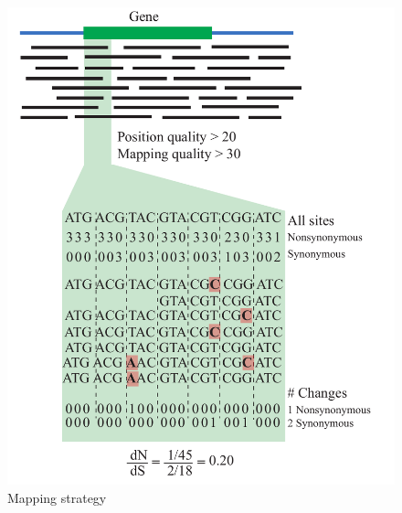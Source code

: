 \begin{figure}[!hbtp]
  \centering
  \includegraphics[width=\textwidth]{Chapter5/Figures/MappingStrategy.pdf}
  \caption{Mapping strategy}
  \label{MappingStrategy}
\end{figure}

